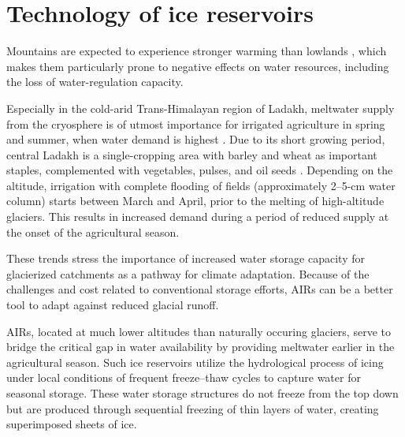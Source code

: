\chapter{Technology of ice reservoirs}
\label{chap:tech}


Mountains are expected to experience stronger warming than lowlands
\citep{ragettliContrastingClimateChange2016}, which makes them particularly prone to negative effects on
water resources, including the loss of water-regulation capacity.

Especially in the cold-arid Trans-Himalayan region of Ladakh, meltwater supply from the cryosphere is of utmost
importance for irrigated agriculture in spring and summer, when water demand is highest
\citep{nusserCryosphereFedIrrigationNetworks2019}. Due to its short growing period, central Ladakh is a
single-cropping area with barley and wheat as important staples, complemented with vegetables, pulses, and oil
seeds \citep{nusserSociohydrologyArtificialGlaciers2019}. Depending on the altitude, irrigation with complete
flooding of fields (approximately 2–5-cm water column) starts between March and April, prior to the melting of
high-altitude glaciers. This results in increased demand during a period of reduced supply at the onset of the
agricultural season.

These trends stress the importance of increased water storage capacity for glacierized catchments as a pathway
for climate adaptation. Because of the challenges and cost related to conventional storage efforts, AIRs can be
a better tool to adapt against reduced glacial runoff. 

AIRs, located at much lower altitudes than naturally occuring glaciers, serve to bridge the critical gap in
water availability by providing meltwater earlier in the agricultural season. Such ice reservoirs utilize the
hydrological process of icing under local conditions of frequent freeze--thaw cycles to capture water for
seasonal storage. These water storage structures do not freeze from the top down but are produced
through sequential freezing of thin layers of water, creating superimposed sheets of ice.



